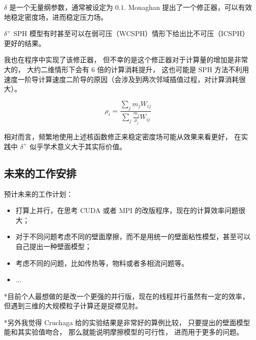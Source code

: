 \begin{frame}
    $\delta$ 是一个无量纲参数，通常被设定为 $0.1$.
Monaghan 提出了一个修正器，可以有效地稳定密度场，进而稳定压力场。

$\delta^+$ SPH 模型有时甚至可以在弱可压（WCSPH）情形下给出比不可压（ICSPH）更好的结果。


我也在程序中实现了该修正器，
但不幸的是这个修正器对于计算量的增加是非常大的，
大约二维情形下会有 $6$ 倍的计算消耗提升，
这也可能是 SPH 方法不利用速度一阶导计算速度二阶导的原因（会涉及到两次邻域插值过程，对计算消耗很大）。

\begin{equation}
    \rho_i = \frac{\sum_j m_j W_{ij}}{\sum_j \frac{m_j}{\rho_j}W_{ij}}
\end{equation}

相对而言，频繁地使用上述核函数修正来稳定密度场可能从效果来看更好，
在实践中
$\delta^+$ 似乎学术意义大于其实际价值。
\end{frame}

\subsection{未来的工作安排}

\begin{frame}
    预计未来的工作计划：
    \begin{itemize}
        \item 打算上并行，在思考 CUDA 或者 MPI 的改版程序，现在的计算效率问题很大；
        \item 对于不同问题考虑不同的壁面摩擦，而不是用统一的壁面粘性模型，甚至可以自己提出一种壁面模型；
        \item 考虑不同的问题，比如传热等，物料或者多相流问题等。
        \item ...
    \end{itemize}
    *目前个人最想做的是改一个更强的并行版，现在的线程并行虽然有一定的效率，
    但遇到三维的大规模粒子计算还是捉襟见肘。
    
    *另外我觉得 Cruchaga 给的实验结果是非常好的算例比较，
    只要提出的壁面模型能和其实验值吻合，
    那么就能说明摩擦模型的可行性，
    进而用于更多的问题。
\end{frame}